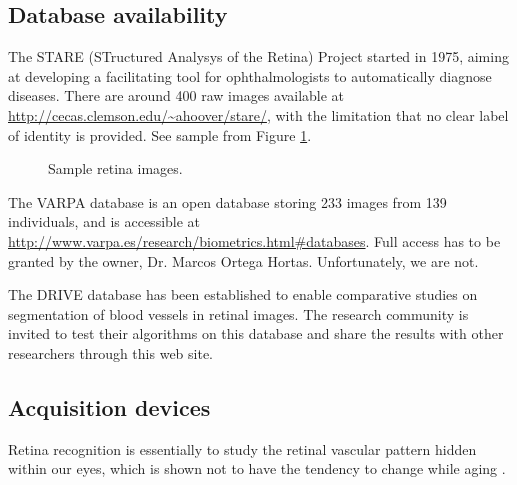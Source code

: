 \documentclass[a4paper,11pt]{article}
\theoremstyle{plain} %
\begin{document}
\subsection{Database availability}

The STARE (STructured Analysys of the Retina) Project started in 1975, aiming at developing a facilitating tool for ophthalmologists to automatically diagnose diseases. There are around 400 raw images available at \url{http://cecas.clemson.edu/~ahoover/stare/}, with the limitation that no clear label of identity is provided. See sample from Figure \ref{fig}.

\begin{figure}
	\centering
	\quad
	\caption{Sample retina images.}
	\label{fig}
\end{figure}


The VARPA database is an open database storing 233 images from 139 individuals, and is accessible at \url{http://www.varpa.es/research/biometrics.html#databases}. Full access has to be granted by the owner, Dr. Marcos Ortega Hortas. Unfortunately, we are not.

The DRIVE database has been established to enable comparative studies on segmentation of blood vessels in retinal images. The research community is invited to test their algorithms on this database and share the results with other researchers through this web site.


\subsection{Acquisition devices}
Retina recognition is essentially to study the retinal vascular pattern hidden within our eyes, which is shown not to have the tendency to change while aging \cite{fatima2013feature}. 
\end{document}

